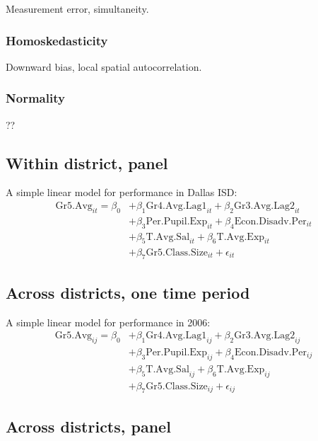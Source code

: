 \documentclass[11pt]{article}
\begin{document}
Measurement error, simultaneity.

\subsubsection{Homoskedasticity}

Downward bias, local spatial autocorrelation. 


\subsubsection{Normality}

??

\subsection{Within district, panel}
\label{ss:nextsub2}

A simple linear model for performance in Dallas ISD:
\begin{align*}
\mathrm{Gr5.Avg}_{it} = \beta_{0} 
    &+ \beta_{1}  \mathrm{Gr4.Avg.Lag1}_{it} 
    + \beta_{2}  \mathrm{Gr3.Avg.Lag2}_{it}    \\
    &+ \beta_{3}  \mathrm{Per.Pupil.Exp}_{it} 
    + \beta_{4}  \mathrm{Econ.Disadv.Per}_{it} \\
    &+ \beta_{5}  \mathrm{T.Avg.Sal}_{it}   
    + \beta_{6}  \mathrm{T.Avg.Exp}_{it}  \\
    &+ \beta_{7}  \mathrm{Gr5.Class.Size}_{it} + \epsilon_{it}
\end{align*}

\subsection{Across districts, one time period}
\label{ss:nextsub3}

A simple linear model for performance in 2006:
\begin{align*}
\mathrm{Gr5.Avg}_{ij} = \beta_{0} 
    &+ \beta_{1}  \mathrm{Gr4.Avg.Lag1}_{ij} 
    + \beta_{2}  \mathrm{Gr3.Avg.Lag2}_{ij}    \\
    &+ \beta_{3}  \mathrm{Per.Pupil.Exp}_{ij} 
    + \beta_{4}  \mathrm{Econ.Disadv.Per}_{ij} \\
    &+ \beta_{5}  \mathrm{T.Avg.Sal}_{ij}   
    + \beta_{6}  \mathrm{T.Avg.Exp}_{ij}  \\
    &+ \beta_{7}  \mathrm{Gr5.Class.Size}_{ij} + \epsilon_{ij}
\end{align*}

\subsection{Across districts, panel}
\label{ss:nextsub4}
\end{document}
